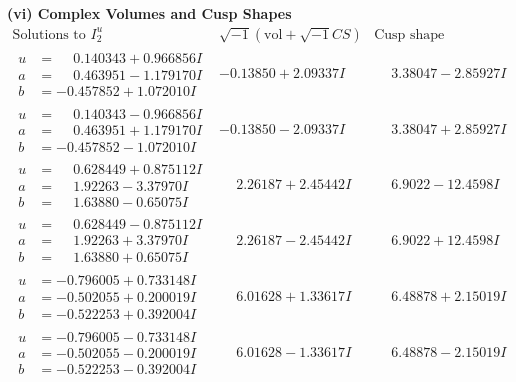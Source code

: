 \documentclass[1p]{elsarticle_modified}
\theoremstyle{definition}
\newcommand{\I}{\sqrt{-1}}
\begin{document}
\newpage\flushleft \textbf{(vi) Complex Volumes and Cusp Shapes}
$$\begin{array}{c|c|c}  
\text{Solutions to }I^u_{2}& \I (\text{vol} + \sqrt{-1}CS) & \text{Cusp shape}\\
 \hline 
\begin{aligned}
u &= \phantom{-}0.140343 + 0.966856 I \\
a &= \phantom{-}0.463951 - 1.179170 I \\
b &= -0.457852 + 1.072010 I\end{aligned}
 & -0.13850 + 2.09337 I & \phantom{-}3.38047 - 2.85927 I \\ \hline\begin{aligned}
u &= \phantom{-}0.140343 - 0.966856 I \\
a &= \phantom{-}0.463951 + 1.179170 I \\
b &= -0.457852 - 1.072010 I\end{aligned}
 & -0.13850 - 2.09337 I & \phantom{-}3.38047 + 2.85927 I \\ \hline\begin{aligned}
u &= \phantom{-}0.628449 + 0.875112 I \\
a &= \phantom{-}1.92263 - 3.37970 I \\
b &= \phantom{-}1.63880 - 0.65075 I\end{aligned}
 & \phantom{-}2.26187 + 2.45442 I & \phantom{-}6.9022 - 12.4598 I \\ \hline\begin{aligned}
u &= \phantom{-}0.628449 - 0.875112 I \\
a &= \phantom{-}1.92263 + 3.37970 I \\
b &= \phantom{-}1.63880 + 0.65075 I\end{aligned}
 & \phantom{-}2.26187 - 2.45442 I & \phantom{-}6.9022 + 12.4598 I \\ \hline\begin{aligned}
u &= -0.796005 + 0.733148 I \\
a &= -0.502055 + 0.200019 I \\
b &= -0.522253 + 0.392004 I\end{aligned}
 & \phantom{-}6.01628 + 1.33617 I & \phantom{-}6.48878 + 2.15019 I \\ \hline\begin{aligned}
u &= -0.796005 - 0.733148 I \\
a &= -0.502055 - 0.200019 I \\
b &= -0.522253 - 0.392004 I\end{aligned}
 & \phantom{-}6.01628 - 1.33617 I & \phantom{-}6.48878 - 2.15019 I \\ \hline\begin{aligned}

\end{aligned}
\end{array}$$
\end{document}

